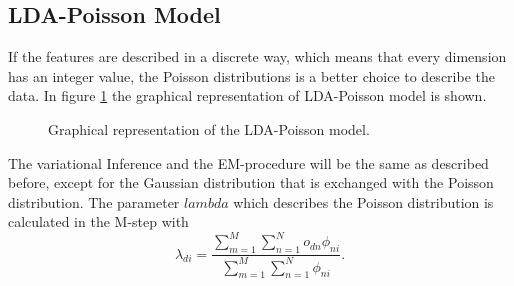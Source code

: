 \documentclass[a4paper,fleqn]{article}
\begin{document}
\subsection{LDA-Poisson Model}


If the features are described in a discrete way, which means that every dimension has an integer value, the Poisson distributions is a better choice to describe the data. In figure \ref{fig:LDAPoisson} the graphical representation of LDA-Poisson model is shown. 

\begin{figure}[h!]
\centering
\def\svgwidth{0.8\textwidth}

\caption{Graphical representation of the LDA-Poisson model.}
\label{fig:LDAPoisson}
\end{figure}

The variational Inference and the EM-procedure will be the same as described before, except for the Gaussian distribution that is exchanged with the Poisson distribution. The parameter $lambda$ which describes the Poisson distribution is calculated in the M-step with
\begin{equation}
 \lambda_{di} = \frac{\sum_{m=1}^M \sum_{n=1}^N o_{dn} \phi_{ni} }{\sum_{m=1}^M \sum_{n=1}^N  \phi_{ni}}.
\end{equation}
\end{document}
